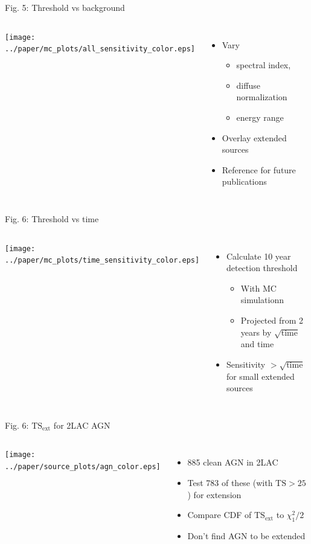 \documentclass[12pt]{beamer}
\begin{document}
\begin{frame}{Fig. 5: Threshold vs background}
  \begin{columns}
    \texttt{[image: ../paper/mc\_plots/all\_sensitivity\_color.eps]}
    \begin{itemize}
      \item Vary 
        \begin{itemize}
          \item spectral index, 
          \item diffuse normalization
          \item energy range
        \end{itemize}
      \item Overlay extended sources
      \item Reference for future publications
    \end{itemize}
  \end{columns}
\end{frame}

\begin{frame}{Fig. 6: Threshold vs time}
  \begin{columns}
    \texttt{[image: ../paper/mc\_plots/time\_sensitivity\_color.eps]}
    \begin{itemize}
      \item Calculate 10 year detection
        threshold
        \begin{itemize}
          \item With MC simulationn
          \item Projected from 2 years by $\sqrt{\text{time}}$ and 
            time
        \end{itemize}
      \item Sensitivity $>\sqrt{\text{time}}$ for
        small extended sources
    \end{itemize}
  \end{columns}
\end{frame}


\begin{frame}{Fig. 6: $\text{TS}_\text{ext}$ for 2LAC AGN}

  \begin{columns}
    \texttt{[image: ../paper/source\_plots/agn\_color.eps]}
    \begin{itemize}
      \item 885 clean AGN in 2LAC
        \item Test 783 of these (with $\text{TS}>25$)
        for extension
      \item Compare CDF of $\text{TS}_\text{ext}$ to $\chi^2_1/2$
      \item Don't find AGN to be extended
    \end{itemize}
  \end{columns}
\end{frame}
\end{document}
